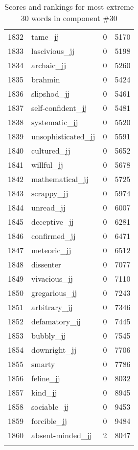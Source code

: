 \begin{longtable}[!htbp]{| rlr@{.}l |}
    1832 & tame\_jj & 0 & 5170 \\
    1833 & lascivious\_jj & 0 & 5198 \\
    1834 & archaic\_jj & 0 & 5260 \\
    1835 & brahmin & 0 & 5424 \\
    1836 & slipshod\_jj & 0 & 5461 \\
    1837 & self-confident\_jj & 0 & 5481 \\
    1838 & systematic\_jj & 0 & 5520 \\
    1839 & unsophisticated\_jj & 0 & 5591 \\
    1840 & cultured\_jj & 0 & 5652 \\
    1841 & willful\_jj & 0 & 5678 \\
    1842 & mathematical\_jj & 0 & 5725 \\
    1843 & scrappy\_jj & 0 & 5974 \\
    1844 & unread\_jj & 0 & 6007 \\
    1845 & deceptive\_jj & 0 & 6281 \\
    1846 & confirmed\_jj & 0 & 6471 \\
    1847 & meteoric\_jj & 0 & 6512 \\
    1848 & dissenter & 0 & 7077 \\
    1849 & vivacious\_jj & 0 & 7110 \\
    1850 & gregarious\_jj & 0 & 7243 \\
    1851 & arbitrary\_jj & 0 & 7346 \\
    1852 & defamatory\_jj & 0 & 7445 \\
    1853 & bubbly\_jj & 0 & 7545 \\
    1854 & downright\_jj & 0 & 7706 \\
    1855 & smarty & 0 & 7786 \\
    1856 & feline\_jj & 0 & 8032 \\
    1857 & kind\_jj & 0 & 8945 \\
    1858 & sociable\_jj & 0 & 9453 \\
    1859 & forcible\_jj & 0 & 9484 \\
    1860 & absent-minded\_jj & 2 & 8047 \\
    \hline
    \caption{Scores and rankings for most extreme 30 words in component \#30} \\
\end{longtable}
